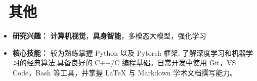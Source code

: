\documentclass[11pt]{article}
\begin{document}
\section{\makebox[\widthof{\faCogs}][c]{\color{CVBlue}\faCogs}\ 其他}
\begin{itemize}[nosep]
    \item \textbf{研究兴趣：} \textbf{计算机视觉}，\textbf{具身智能}，多模态大模型，强化学习
    \item \textbf{核心技能：}  较为熟练掌握 Python 以及 Pytorch 框架, 了解深度学习和机器学习的经典算法,具备良好的 C++/C 编程基础。日常开发中使用 Git，VS Code，Bash 等工具，并掌握 LaTeX 与 Markdown 学术文档撰写能力。
\end{itemize}
    
\end{document}
